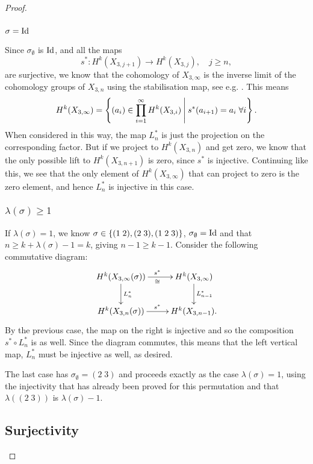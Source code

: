 \begin{proof}
  \subsubsection{$\sigma = \operatorname{Id}$}
  
  Since $\sigma_{\emptyset}$ is $\operatorname{Id}$, and all the maps
  \[ s^* : H^k(X_{3,j+1}) \to H^k(X_{3,j}), \quad j \geq n, \]
  are surjective, we know that the cohomology
  of $X_{3,\infty}$ is the inverse
  limit of the cohomology groups of $X_{3,n}$ using the stabilisation
  map, see e.g. \cite[Chapter 19.4]{may}.
  This means
  \[ H^k(X_{3,\infty}) = \left\{  (a_i)\in \prod_{i=1}^\infty
    H^k(X_{3,i}) \:\Bigg\vert\: s^*(a_{i+1}) = a_i \;\forall i \right\}. \]
  When considered in this way, the map $L_n^*$ is just the projection on
  the corresponding factor. But if we project to $H^k(X_{3,n})$ and
  get zero, we know that
  the only possible lift to $H^k(X_{3,n+1})$ is zero, since $s^*$ is
  injective. Continuing like this, we see that the only element of
  $H^k(X_{3,\infty})$ that can project to zero is the zero element, and
  hence $L_n^*$ is injective in this case.
  
  \subsubsection{$\lambda(\sigma) \geq 1$}
  
  If $\lambda(\sigma)=1$, we know $\sigma \in
  \left\{ (1\;2),(2\;3),(1\;2\;3) \right\}$,
  $\sigma_{\emptyset} = \operatorname{Id}$ and that $n \geq k + \lambda(\sigma) - 1 =
  k$, giving $n-1\geq k-1$. Consider the following commutative diagram:
  \[ \xymatrix{ H^k(X_{3,\infty}(\sigma)) \ar[r]^{s^*}_{\cong}
    \ar[d]^{L_n^*} & 
    H^k(X_{3,\infty}) \ar[d]^{L_{n-1}^*} \\
    H^k(X_{3,n}(\sigma)) \ar[r]^{s^*} & H^k(X_{3,n-1}).
  } \]
  By the previous case, the map on the right is injective and so the
  composition $s^* \circ L_{n}^*$ is as well. Since the diagram
  commutes, this means that the left vertical map, $L_n^*$ must be
  injective as well, as desired.
  
  The last case has $\sigma_{\emptyset} = (2\;3)$ and proceeds exactly
  as the case $\lambda(\sigma) = 1$, using the injectivity that has
  already been proved for this permutation and that $\lambda((2\;3))$ is
  $\lambda(\sigma)-1$.
  
  \subsection{Surjectivity}
  

\end{proof}
